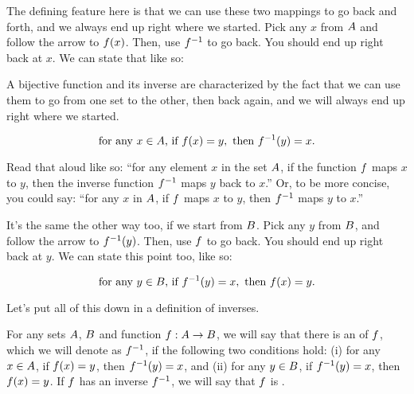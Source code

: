 \documentclass[../../../main.tex]{subfiles}
\begin{document}
The defining feature here is that we can use these two mappings to go back and forth, and we always end up right where we started. Pick any $x$ from $A$ and follow the arrow to $f(x)$. Then, use $f^{-1}$ to go back. You should end up right back at $x$. We can state that like so:

\begin{aside}
  \begin{remark}
    A bijective function and its inverse are characterized by the fact that we can use them to go from one set to the other, then back again, and we will always end up right where we started.
  \end{remark}
\end{aside}

\begin{equation*}
  \text{for any $x \in A$, if } f(x) = y, \text{ then } f^{-1}(y) = x.
\end{equation*}

Read that aloud like so: ``for any element $x$ in the set $A$, if the function $f$ maps $x$ to $y$, then the inverse function $f^{-1}$ maps $y$ back to $x$.'' Or, to be more concise, you could say: ``for any $x$ in $A$, if $f$ maps $x$ to $y$, then $f^{-1}$ maps $y$ to $x$.''

It's the same the other way too, if we start from $B$. Pick any $y$ from $B$, and follow the arrow to $f^{-1}(y)$. Then, use $f$ to go back. You should end up right back at $y$. We can state this point too, like so:

\begin{equation*}
  \text{for any $y \in B$, if } f^{-1}(y) = x, \text{ then } f(x) = y.
\end{equation*}

Let's put all of this down in a definition of inverses.

\begin{fdefinition}[Inverses]
  \label{def:inverses}
  For any sets $A$, $B$ and function $f: A \rightarrow B$, we will say that there is an  of $f$, which we will denote as $f^{-1}$, if the following two conditions hold: (i) for any $x \in A$, if $f(x) = y$, then $f^{-1}(y) = x$, and (ii) for any $y \in B$, if $f^{-1}(y) = x$, then $f(x) = y$. If $f$ has an inverse $f^{-1}$, we will say that $f$ is .
\end{fdefinition}
\end{document}
